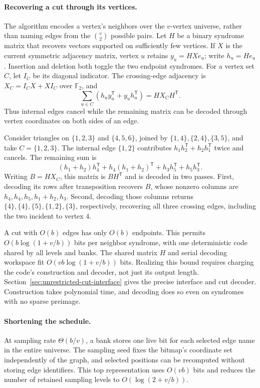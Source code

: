 \documentclass[11pt,letterpaper]{article}
\numberwithin{equation}{section}
\begin{document}
\paragraph{Recovering a cut through its vertices.}
The algorithm encodes a vertex's neighbors over the $v$-vertex universe, rather than naming edges from the $\binom{v}{2}$ possible pairs.
Let $H$ be a binary syndrome matrix that recovers vectors supported on sufficiently few vertices.
If $X$ is the current symmetric adjacency matrix, vertex $u$ retains $y_u=HXe_u$; write $h_u=He_u$.
Insertion and deletion both toggle the two endpoint syndromes.
For a vertex set $C$, let $I_C$ be its diagonal indicator.
The crossing-edge adjacency is $X_C=I_CX+XI_C$ over $\mathbb F_2$, and
\begin{equation}
 \sum_{u\in C}(h_u y_u^{\mathsf T}+y_u h_u^{\mathsf T})
       =HX_CH^{\mathsf T}.
 \label{eq:graph-bilinear-main}
\end{equation}
Thus internal edges cancel while the remaining matrix can be decoded through vertex coordinates on both sides of an edge.

Consider triangles on $\{1,2,3\}$ and $\{4,5,6\}$, joined by $\{1,4\},\{2,4\},\{3,5\}$, and take $C=\{1,2,3\}$.
The internal edge $\{1,2\}$ contributes $h_1h_2^{\mathsf T}+h_2h_1^{\mathsf T}$ twice and cancels.
The remaining sum is
\[
 (h_1+h_2)h_4^{\mathsf T}+h_4(h_1+h_2)^{\mathsf T}
       +h_3h_5^{\mathsf T}+h_5h_3^{\mathsf T}.
\]
Writing $B=HX_C$, this matrix is $BH^{\mathsf T}$ and is decoded in two passes.
First, decoding its rows after transposition recovers $B$, whose nonzero columns are $h_4,h_4,h_5,h_1+h_2,h_3$.
Second, decoding those columns returns $\{4\},\{4\},\{5\},\{1,2\},\{3\}$, respectively, recovering all three crossing edges, including the two incident to vertex $4$.

A cut with $O(b)$ edges has only $O(b)$ endpoints.
This permits $O(b\log(1+v/b))$ bits per neighbor syndrome, with one deterministic code shared by all levels and banks.
The shared matrix $H$ and serial decoding workspace fit $O(vb\log(1+v/b))$ bits.
Realizing this bound requires charging the code's construction and decoder, not just its output length.
Section~\ref{sec:unrestricted-cut-interface} gives the precise interface and cut decoder.
Construction takes polynomial time, and decoding does so even on syndromes with no sparse preimage.

\paragraph{Shortening the schedule.}
\label{sec:graph-bootstrap-branch}
At sampling rate $\Theta(b/v)$, a bank stores one live bit for each selected edge name in the entire universe.
The sampling seed fixes the bitmap's coordinate set independently of the graph, and selected positions can be recomputed without storing edge identifiers.
This top representation uses $O(vb)$ bits and reduces the number of retained sampling levels to $O(\log(2+v/b))$.
\end{document}
